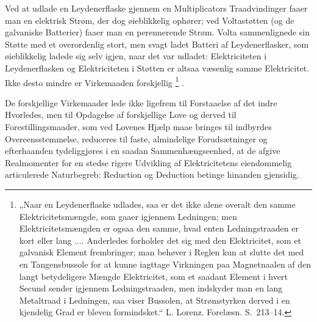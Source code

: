 \documentclass[12pt,a4paper]{book}
\renewcommand{\thefootnote}{*)}
\begin{document}
Ved at udlade en Leydenerflaske gjennem en Multiplicators
Traadvindinger faaer man en elektrisk Strøm, der dog øieblikkelig
ophører; ved Voltastøtten (og de galvaniske Batterier) faaer man en
perennerende Strøm. Volta sammenlignede sin Støtte med et overordenlig
stort, men svagt ladet Batteri af Leydenerflasker, som øieblikkelig
ladede sig selv igjen, naar det var udladet: Elektriciteten i
Leydenerflasken og Elektriciteten i Støtten er altsaa væsenlig samme
Elektricitet. Ikke desto mindre er Virkemaaden forskjellig%
\renewcommand{\thefootnote}{**)}%
\footnote{%
„Naar en Leydenerflaske udlades, saa er det ikke alene overalt den
samme Elektricitetsmængde, som gaaer igjennem Ledningen; men
Elektricitetsmængden er ogsaa den samme, hvad enten Ledningstraaden er
kort eller lang .... Anderledes forholder det sig med den
Elektricitet, som et galvanisk Element frembringer; man behøver i
Reglen kun at slutte det med en Tangensbussole for at kunne iagttage
Virkningen paa Magnetnaalen af den langt betydeligere Mængde
Elektricitet, som et saadant Element i hvert Secund sender igjennem
Ledningstraaden, men indskyder man en lang Metaltraad i Ledningen, saa
viser Bussolen, at Strømstyrken derved i en kjendelig Grad er bleven
formindsket.“ L. Lorenz. Forelæsn. S.\ 213--14.}%
\renewcommand{\thefootnote}{*)}%
.

De forskjellige Virkemaader lede ikke ligefrem til Forstaaelse af det
indre Hvorledes, men til Opdagelse af forskjellige Love og derved til
Forestillingsmaader, som ved Lovenes Hjælp maae bringes til indbyrdes
Overeensstemmelse, reduceres til faste, almindelige Forudsætninger og
efterhaanden tydeliggjøres i en saadan Sammenhængseenhed, at de afgive
Realmomenter for en stedse rigere Udvikling af Elektricitetens
eiendommelig articulerede Naturbegreb: Reduction og Deduction betinge
hinanden gjensidig.
\end{document}
